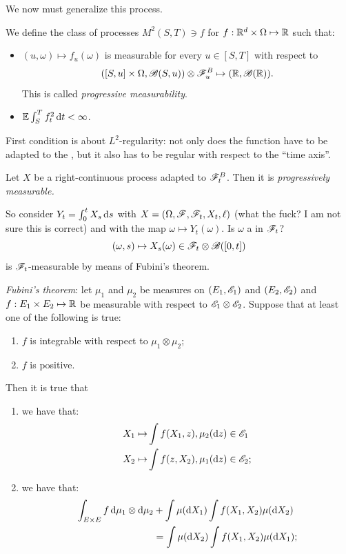 \documentclass[crop=false, class=article]{standalone}
\begin{document}
We now must generalize this process.
\begin{definition}
	We define the class of processes $M^{2}(S,T)\ni f$ for $f:\mathbb{R}^{d}\times\Omega\mapsto\mathbb{R}$ such that:
	\begin{itemize}
		\item $(u,\omega)\mapsto f_u(\omega)$ is measurable for every $u\in[S,T]$ with respect to 
		\begin{equation*}
			\left([S,u]\times\Omega,\mathscr{B}({S,u})\right)\otimes\mathscr{F}^{B}_{u}\mapsto(\mathbb{R},\mathscr{B}(\mathbb{R})).
		\end{equation*}
		This is called \emph{progressive measurability}.
		\item $\mathbb{E}\int_S^{T}f_{t}^2\mathop{}\!\mathrm{d} t<\infty$.
	\end{itemize}
\end{definition}
First condition is about $L^{2}$-regularity: not only does the function have to be adapted to the \brm, but it also has to be regular with respect to the ``time axis''.
\begin{proposition}
	Let $X$ be a right-continuous process adapted to $\mathscr{F}^{B}_{t}$. Then it is \emph{progressively measurable.}
\end{proposition}
So consider $Y_{t}=\int_{0}^{t}X_{s}\mathop{}\!\mathrm{d} s$ with $X=\left(\Omega,\mathscr{F},\mathscr{F}_{t},X_{t},\ell\right)$ (what the fuck? I am not sure this is correct) and with the map $\omega\mapsto Y_{t}(\omega)$. Is $\omega$ a \rv{} in $\mathscr{F}_{t}$?
\begin{equation*}
	(\omega,s)\mapsto X_{s}(\omega)\in\mathscr{F}_{t}\otimes\mathscr{B}([0,t])
\end{equation*}
is $\mathscr{F}_{t}$-measurable by means of Fubini's theorem.
\begin{revise}
	\begin{theorem}
		\emph{Fubini's theorem}: let $\mu_1$ and $\mu_2$ be measures on $(E_1,\mathscr{E}_1)$ and $(E_2,\mathscr{E}_2)$ and $f:E_1\times E_2\mapsto\mathbb{R}$ be measurable with respect to $\mathscr{E}_1\otimes\mathscr{E}_2$. Suppose that at least one of the following is true:
		\begin{enumerate}[\circnum]
			\item $f$ is integrable with respect to $\mu_1\otimes\mu_2$;
			\item $f$ is positive.
		\end{enumerate}
		Then it is true that
		\begin{enumerate}
			\item we have that:
			\begin{align*}
				X_1\mapsto & \int f(X_1,z),\mu_2(\mathop{}\!\mathrm{d} z)\in\mathscr{E}_1 \\
				X_2\mapsto & \int f(z,X_2),\mu_1(\mathop{}\!\mathrm{d} z)\in\mathscr{E}_2;
			\end{align*}
			\item we have that:
			\begin{align*}
				 \int_{E\times E} f\mathop{}\!\mathrm{d}\mu_1\otimes\mathop{}\!\mathrm{d}\mu_2 & +\int\mu(\mathop{}\!\mathrm{d} X_{1})\int f(X_1,X_2)\mu(\mathop{}\!\mathrm{d} X_{2}) \\
				 & =\int\mu(\mathop{}\!\mathrm{d} X_{2})\int f(X_{1},X_{2})\mu(\mathop{}\!\mathrm{d} X_{1});
			\end{align*}
		\end{enumerate}
	\end{theorem}
\end{revise}
\end{document}
